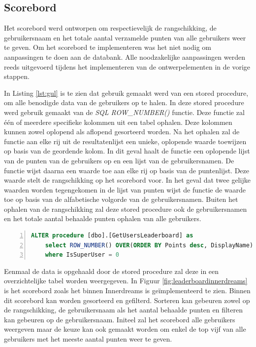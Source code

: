 \subsection{Scorebord}

Het scorebord werd ontworpen om respectievelijk de rangschikking, de gebruikersnaam en het totale aantal verzamelde punten van alle gebruikers weer te geven. Om het scorebord te implementeren was het niet nodig om aanpassingen te doen aan de databank. Alle noodzakelijke aanpassingen werden reeds uitgevoerd tijdens het implementeren van de ontwerpelementen in de vorige stappen.

In Listing \ref{lst:gul} is te zien dat gebruik gemaakt werd van een stored procedure, om alle benodigde data van de gebruikers op te halen. In deze stored procedure werd gebruik gemaakt van de \textit{SQL ROW\_NUMBER()} functie. Deze functie zal één of meerdere specifieke kolommen uit een tabel ophalen. Deze kolommen kunnen zowel oplopend als aflopend gesorteerd worden. Na het ophalen zal de functie aan elke rij uit de resultatenlijst een unieke, oplopende waarde toewijzen op basis van de geordende kolom. In dit geval haalt de functie een oplopende lijst van de punten van de gebruikers op en een lijst van de gebruikersnamen. De functie wijst daarna een waarde toe aan elke rij op basis van de puntenlijst. Deze waarde stelt de rangschikking op het scorebord voor. In het geval dat twee gelijke waarden worden tegengekomen in de lijst van punten wijst de functie de waarde toe op basis van de alfabetische volgorde van de gebruikersnamen. Buiten het ophalen van de rangschikking zal deze stored procedure ook de gebruikersnamen en het totale aantal behaalde punten ophalen van alle gebruikers.

\begin{lstlisting}[caption={De GetUsersLeaderboard stored procedure.},
    label={lst:gul},
    language=SQL,
    showspaces=false,
    basicstyle=\ttfamily,
    numbers=left,
    numberstyle=\tiny,
    numbersep=1pt,
    breaklines=true
    commentstyle=\color{gray}]
    ALTER procedure [dbo].[GetUsersLeaderboard] as
    select ROW_NUMBER() OVER(ORDER BY Points desc, DisplayName) as Rank, DisplayName, Points from dbo.Users
    where IsSuperUser = 0
\end{lstlisting}

Eenmaal de data is opgehaald door de stored procedure zal deze in een overzichtelijke tabel worden weergegeven. In Figuur \ref{fig:leaderboardinnerdreams} is het scorebord zoals het binnen Innerdreams is geïmplementeerd te zien. Binnen dit scorebord kan worden gesorteerd en gefilterd. Sorteren kan gebeuren zowel op de rangschikking, de gebruikersnaam als het aantal behaalde punten en filteren kan gebeuren op de gebruikersnaam. Initeel zal het scorebord alle gebruikers weergeven maar de keuze kan ook gemaakt worden om enkel de top vijf van alle gebruikers met het meeste aantal punten weer te geven.

